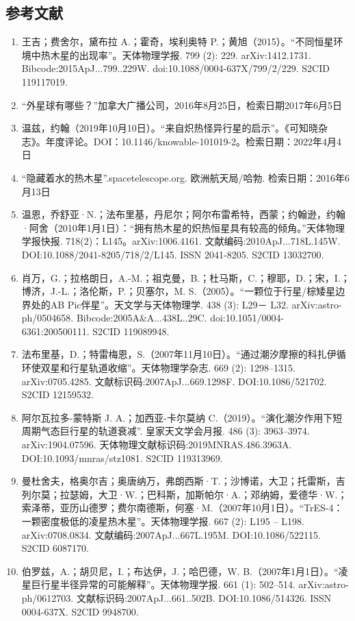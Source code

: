 \subsection{参考文献}
\begin{enumerate}
\item 王吉；费舍尔，黛布拉 A.；霍奇，埃利奥特 P.；黄旭（2015）。“不同恒星环境中热木星的出现率”。天体物理学报. 799 (2): 229. arXiv:1412.1731. Bibcode:2015ApJ...799..229W. doi:10.1088/0004-637X/799/2/229. S2CID 119117019.
\item “外星球有哪些？”加拿大广播公司，2016年8月25日，检索日期2017年6月5日
\item 温兹，约翰（2019年10月10日）。“来自炽热怪异行星的启示”。《可知晓杂志》。年度评论。DOI：10.1146/knowable-101019-2。检索日期：2022年4月4日
\item “隐藏着水的热木星”.spacetelescope.org. 欧洲航天局/哈勃. 检索日期：2016年6月13日
\item 温恩，乔舒亚·N.；法布里基，丹尼尔；阿尔布雷希特，西蒙；约翰逊，约翰·阿舍（2010年1月1日）：“拥有热木星的炽热恒星具有较高的倾角。”天体物理学报快报. 718(2)：L145。arXiv:1006.4161. 文献编码:2010ApJ...718L.145W. DOI:10.1088/2041-8205/718/2/L145. ISSN 2041-8205. S2CID 13032700.
\item 肖万，G.；拉格朗日，A.-M.；祖克曼，B.；杜马斯，C.；穆耶，D.；宋，I.；博济，J.-L.；洛伦斯，P.；贝塞尔，M. S.（2005）。“一颗位于行星/棕矮星边界处的AB Pic伴星”。天文学与天体物理学. 438 (3): L29－ L32. arXiv:astro-ph/0504658. Bibcode:2005A&A...438L..29C. doi:10.1051/0004-6361:200500111. S2CID 119089948.
\item 法布里基，D.；特雷梅恩，S.（2007年11月10日）。“通过潮汐摩擦的科扎伊循环使双星和行星轨道收缩”。天体物理学杂志. 669 (2): 1298–1315. arXiv:0705.4285. 文献标识码:2007ApJ...669.1298F. DOI:10.1086/521702. S2CID 12159532.
\item 阿尔瓦拉多-蒙特斯 J. A.；加西亚-卡尔莫纳 C.（2019）。“演化潮汐作用下短周期气态巨行星的轨道衰减”. 皇家天文学会月报. 486 (3): 3963–3974. arXiv:1904.07596. 天体物理文献标识码:2019MNRAS.486.3963A. DOI:10.1093/mnras/stz1081. S2CID 119313969.
\item 曼杜舍夫，格奥尔吉；奥唐纳万，弗朗西斯·T.；沙博诺，大卫；托雷斯，吉列尔莫；拉瑟姆，大卫·W.；巴科斯，加斯帕尔·A.；邓纳姆，爱德华·W.；索泽蒂，亚历山德罗；费尔南德斯，何塞·M.（2007年10月1日）。“TrES-4：一颗密度极低的凌星热木星”。天体物理学报. 667 (2): L195 – L198. arXiv:0708.0834. 文献编码:2007ApJ...667L.195M. DOI:10.1086/522115. S2CID 6087170.
\item 伯罗兹，A.；胡贝尼，I.；布达伊，J.；哈巴德，W. B.（2007年1月1日）。“凌星巨行星半径异常的可能解释”。天体物理学报. 661 (1): 502–514. arXiv:astro-ph/0612703. 文献标识码:2007ApJ...661..502B. DOI:10.1086/514326. ISSN 0004-637X. S2CID 9948700.

\end{enumerate}
